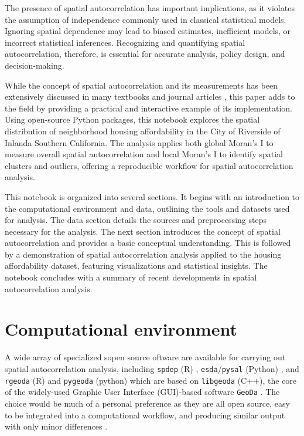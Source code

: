 \documentclass[
]{aft}
\begin{document}
The presence of spatial autocorrelation has important implications, as
it violates the assumption of independence commonly used in classical
statistical models. Ignoring spatial dependence may lead to biased
estimates, inefficient models, or incorrect statistical inferences.
Recognizing and quantifying spatial autocorrelation, therefore, is
essential for accurate analysis, policy design, and decision-making.

While the concept of spatial autocorrelation and its measurements has
been extensively discussed in many textbooks and journal articles
\citep{OSullivan:2010, de2007geospatial, bivand2013applied, rey2023geographic},
this paper adds to the field by providing a practical and interactive
example of its implementation. Using open-source Python packages, this
notebook explores the spatial distribution of neighborhood housing
affordability in the City of Riverside of Inlanda Southern California.
The analysis applies both global Moran's I to measure overall spatial
autocorrelation and local Moran's I to identify spatial clusters and
outliers, offering a reproducible workflow for spatial autocorrelation
analysis.

This notebook is organized into several sections. It begins with an
introduction to the computational environment and data, outlining the
tools and datasets used for analysis. The data section details the
sources and preprocessing steps necessary for the analysis. The next
section introduces the concept of spatial autocorrelation and provides a
basic conceptual understanding. This is followed by a demonstration of
spatial autocorrelation analysis applied to the housing affordability
dataset, featuring visualizations and statistical insights. The notebook
concludes with a summary of recent developments in spatial
autocorrelation analysis.

\section{Computational environment}\label{sec-ce}

A wide array of specialized sopen source oftware are available for
carrying out spatial autocorrelation analysis, including \texttt{spdep}
(R) \citep{Pebesma2023}, \texttt{esda}/\texttt{pysal} (Python)
\citep{pysal2007}, and \texttt{rgeoda} (R) and \texttt{pygeoda} (python)
which are based on \texttt{libgeoda} (C++), the core of the widely-used
Graphic User Interface (GUI)-based software \texttt{GeoDa}
\citep{Anselin20221}. The choice would be much of a personal preference
as they are all open source, easy to be integrated into a computational
workflow, and producing similar output with only minor differences
\citep{Bivand2022}.
\end{document}
